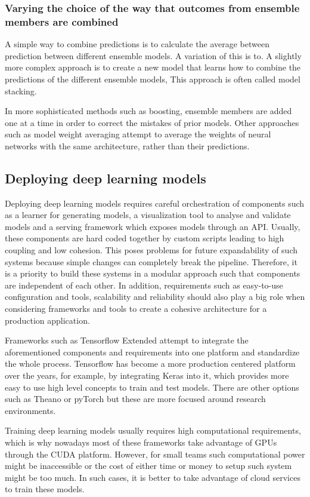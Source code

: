\subsubsection{Varying the choice of the way that outcomes from ensemble members are combined}
A simple way to combine predictions is to calculate the average between prediction between different ensemble models. A variation of this is to.
A slightly more complex approach is to create a new model that learns how to combine the predictions of the different ensemble models, This approach is often called model stacking. \par
In more sophisticated methods such as boosting, ensemble members are added one at a time in order to correct the mistakes of prior models. Other approaches such as model weight averaging \cite{?} attempt to average the weights of neural networks with the same architecture, rather than their predictions. 
\subsection{Deploying deep learning models}
Deploying deep learning models requires careful orchestration of components such as a learner for generating models, a visualization tool to analyse and validate models and a serving framework which exposes models through an API. Usually, these components are hard coded together by custom scripts leading to high coupling and low cohesion. This poses problems for future expandability of such systems because simple changes can completely break the pipeline. Therefore, it is a priority to build these systems in a modular approach such that components are independent of each other. In addition, requirements such as easy-to-use configuration and tools, scalability and reliability should also play a big role when considering frameworks and tools to create a cohesive architecture for a production application. \par
Frameworks such as Tensorflow Extended\cite{Baylor2017} attempt to integrate the aforementioned components and requirements into one platform and standardize the whole process. Tensorflow has become a more production centered platform over the years, for example, by integrating Keras\cite{chollet2015keras} into it, which provides more easy to use high level concepts to train and test models. There are other options such as Theano\cite{Bastien} or pyTorch\cite{pytorch} but these are more focused around research environments. \par   
Training deep learning models usually requires high computational requirements, which is why nowadays most of these frameworks take advantage of GPUs through the CUDA platform. However, for small teams such computational power might be inaccessible or the cost of either time or money to setup such system might be too much. In such cases, it is better to take advantage of cloud services to train these models.  


